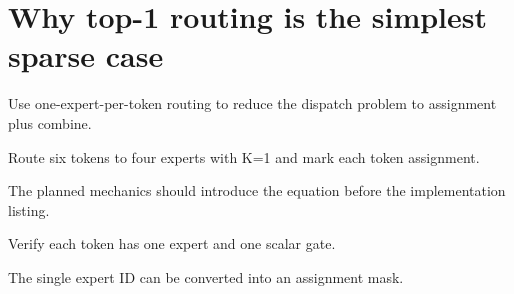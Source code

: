 \section{Why top-1 routing is the simplest sparse case}
\label{sec:ch04-why-top-1-routing-is-the-simplest-sparse-case}

Use one-expert-per-token routing to reduce the dispatch problem to assignment plus combine.



Route six tokens to four experts with K=1 and mark each token assignment.



The planned mechanics should introduce the equation before the implementation listing.





\begin{checkpointbox}
Verify each token has one expert and one scalar gate.
\end{checkpointbox}

The single expert ID can be converted into an assignment mask.
